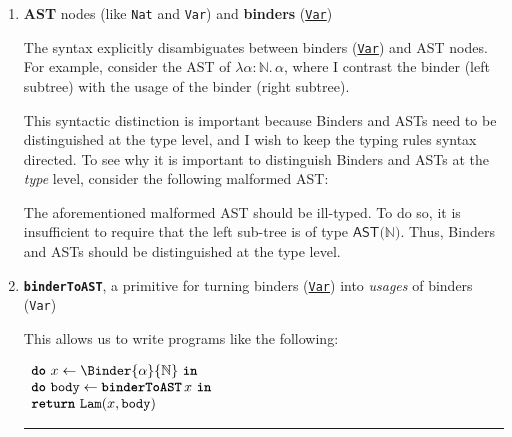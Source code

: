 \begin{enumerate}
\item \textbf{AST} nodes (like \texttt{Nat} and \texttt{Var}) and \textbf{binders} (\underline{\texttt{Var}})

The syntax explicitly disambiguates between binders (\underline{\texttt{Var}}) and AST nodes. For example, consider the AST of $\lambda\alpha{}$${:}\mathbb{N}. \,\alpha$, where I contrast the binder (left subtree) with the usage of the binder (right subtree).

\begin{center}
\end{center}

This syntactic distinction is important because \textsf{Binder}s and \textsf{AST}s need to be distinguished at the type level, and I wish to keep the typing rules syntax directed. To see why it is important to distinguish \textsf{Binder}s and \textsf{AST}s at the \textit{type} level, consider the following malformed AST:
\begin{center}
\end{center}

The aforementioned malformed AST should be ill-typed. To do so, it is insufficient to require that the left sub-tree is of type $\textsf{AST($\mathbb{N}$)}$. Thus, \textsf{Binder}s and \textsf{ASTs} should be distinguished at the type level. 

\item \textbf{\texttt{binderToAST}}, a primitive for turning binders (\underline{\texttt{Var}}) into \textit{usages} of binders (\texttt{Var})

This allows us to write programs like the following:
\begin{core}
$\begin{array}{l}
  \textbf{\texttt{do}} \, \, {x} \leftarrow {\Binder{\alpha}{\mathbb{N}}} \, \, \textbf{\texttt{in}} \\
  \textbf{\texttt{do}} \, \, {\texttt{body}} \leftarrow \textbf{\texttt{binderToAST}} \, x \, \, \textbf{\texttt{in}} \\
  \textbf{\texttt{return}} \, \, \texttt{Lam}(x, \texttt{body})
\end{array}$
\vspace{2mm} 
\textcolor{coreComment}{\hrule height 0.2mm \relax}
\vspace{2mm} 


\end{core}
\end{enumerate}
